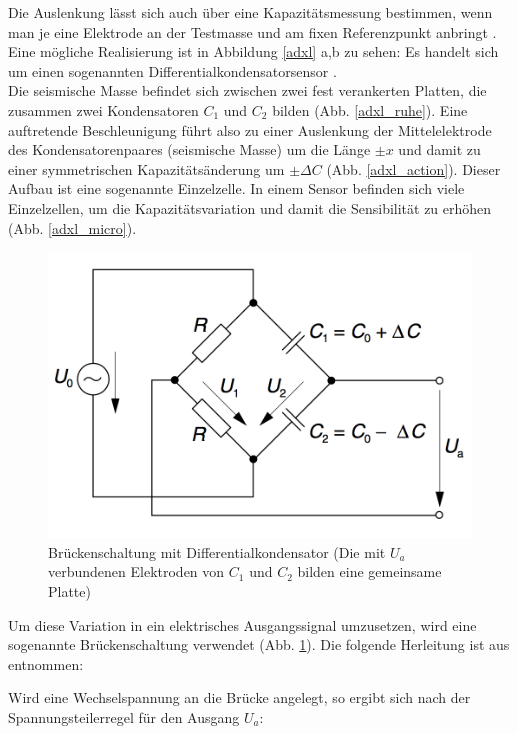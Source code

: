 \documentclass[12pt,a4paper,twoside,BCOR=12.5mm]{scrartcl}
\begin{document}
Die Auslenkung lässt sich auch über eine Kapazitätsmessung bestimmen, wenn man je eine Elektrode an der Testmasse und am fixen Referenzpunkt anbringt \citep{S.J.-Sherman:1992ul}. Eine mögliche Realisierung ist in Abbildung \ref{adxl} a,b zu sehen: Es handelt sich um einen sogenannten Differentialkondensatorsensor \citep{:2002fk}. \\
Die seismische Masse befindet sich zwischen zwei fest verankerten Platten, die zusammen zwei Kondensatoren $C_1$ und $C_2$ bilden (Abb. \ref{adxl_ruhe}). Eine auftretende Beschleunigung führt also zu einer Auslenkung der Mittelelektrode des Kondensatorenpaares (seismische Masse) um die Länge $\pm x$ und damit zu einer symmetrischen Kapazitätsänderung um $\pm \Delta C$ (Abb. \ref{adxl_action}). Dieser Aufbau ist eine sogenannte Einzelzelle. In einem Sensor befinden sich viele Einzelzellen, um die Kapazitätsvariation und damit die Sensibilität zu erhöhen (Abb. \ref{adxl_micro}).

\begin{figure}[htb]
\centering
\includegraphics[scale=2]{schaltung_beschleunigungssensor.png}
\caption{Brückenschaltung mit Differentialkondensator (Die mit $U_a$ verbundenen Elektroden von $C_1$ und $C_2$ bilden eine gemeinsame Platte) \citep{:2002fk}}
\label{bruecke}
\end{figure}

Um diese Variation in ein elektrisches Ausgangssignal umzusetzen, wird eine sogenannte Brückenschaltung verwendet (Abb. \ref{bruecke}).
Die folgende Herleitung ist aus \citep{:2002fk} entnommen:


Wird eine Wechselspannung an die Brücke angelegt, so ergibt sich nach der Spannungsteilerregel für den Ausgang $U_a$:
\end{document}
